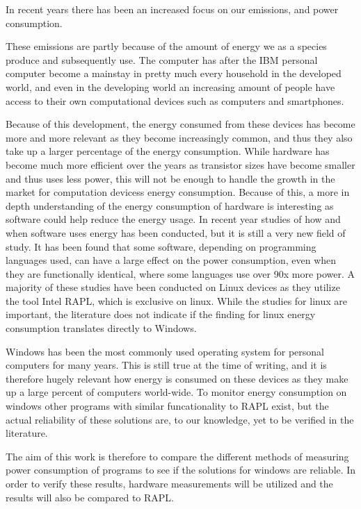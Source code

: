 In recent years there has been an increased focus on our emissions, and power consumption.

These emissions are partly because of the amount of energy we as a species produce and subsequently use. 
The computer has after the IBM personal computer become a mainstay in pretty much every household in the developed world, and even in the developing world an increasing amount of people have access to their own computational devices such as computers and smartphones. 

Because of this development, the energy consumed from these devices has become more and more relevant as they become increasingly common, and thus they also take up a larger percentage of the energy consumption. 
While hardware has become much more efficient over the years as transistor sizes have become smaller and thus uses less power, this will not be enough to handle the growth in the market for computation devicess energy consumption. Because of this, a more in depth understanding of the energy consumption of hardware is interesting as software could help reduce the energy usage. 
In recent year studies of how and when software uses energy has been conducted, but it is still a very new field of study. It has been found that some software, depending on programming languages used, can have a large effect on the power consumption, even when they are functionally identical, where some languages use over 90x more power.
A majority of these studies have been conducted on Linux devices as they utilize the tool Intel RAPL, which is exclusive on linux. While the studies for linux are important, the literature does not indicate if the finding for linux energy consumption translates directly to Windows. 

Windows has been the most commonly used operating system for personal computers for many years. This is still true at the time of writing, and it is therefore hugely relevant how energy is consumed on these devices as they make up a large percent of computers world-wide. To monitor energy consumption on windows other programs with similar funcationality to RAPL exist, but the actual reliability of these solutions are, to our knowledge, yet to be verified in the literature.

The aim of this work is therefore to compare the different methods of measuring power consumption of programs to see if the solutions for windows are reliable. 
In order to verify these results, hardware measurements will be utilized and the results will also be compared to RAPL.


